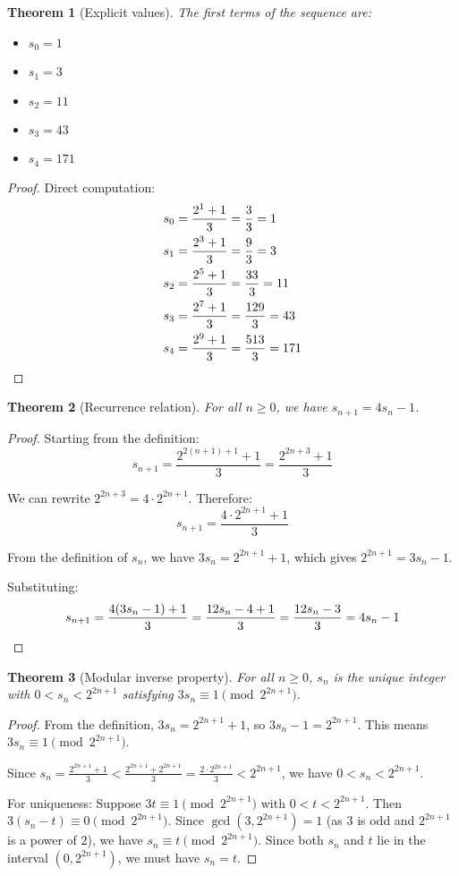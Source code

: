 \documentclass[11pt]{article}
\newtheorem{theorem}{Theorem}[section]
\theoremstyle{definition}
\begin{document}
\begin{theorem}[Explicit values]
The first terms of the sequence are:
\begin{itemize}
\item $s_0 = 1$
\item $s_1 = 3$
\item $s_2 = 11$
\item $s_3 = 43$
\item $s_4 = 171$
\end{itemize}
\end{theorem}

\begin{proof}
Direct computation:
\begin{align}
s_0 &= \frac{2^1 + 1}{3} = \frac{3}{3} = 1\\
s_1 &= \frac{2^3 + 1}{3} = \frac{9}{3} = 3\\
s_2 &= \frac{2^5 + 1}{3} = \frac{33}{3} = 11\\
s_3 &= \frac{2^7 + 1}{3} = \frac{129}{3} = 43\\
s_4 &= \frac{2^9 + 1}{3} = \frac{513}{3} = 171 \qedhere
\end{align}
\end{proof}

\begin{theorem}[Recurrence relation]\label{thm:recurrence}
For all $n \geq 0$, we have $s_{n+1} = 4s_n - 1$.
\end{theorem}

\begin{proof}
Starting from the definition:
\[s_{n+1} = \frac{2^{2(n+1)+1} + 1}{3} = \frac{2^{2n+3} + 1}{3}\]

We can rewrite $2^{2n+3} = 4 \cdot 2^{2n+1}$. Therefore:
\[s_{n+1} = \frac{4 \cdot 2^{2n+1} + 1}{3}\]

From the definition of $s_n$, we have $3s_n = 2^{2n+1} + 1$, which gives $2^{2n+1} = 3s_n - 1$.

Substituting:
\[s_{n+1} = \frac{4(3s_n - 1) + 1}{3} = \frac{12s_n - 4 + 1}{3} = \frac{12s_n - 3}{3} = 4s_n - 1 \qedhere\]
\end{proof}

\begin{theorem}[Modular inverse property]
For all $n \geq 0$, $s_n$ is the unique integer with $0 < s_n < 2^{2n+1}$ satisfying $3s_n \equiv 1 \pmod{2^{2n+1}}$.
\end{theorem}

\begin{proof}
From the definition, $3s_n = 2^{2n+1} + 1$, so $3s_n - 1 = 2^{2n+1}$.
This means $3s_n \equiv 1 \pmod{2^{2n+1}}$.

Since $s_n = \frac{2^{2n+1} + 1}{3} < \frac{2^{2n+1} + 2^{2n+1}}{3} = \frac{2 \cdot 2^{2n+1}}{3} < 2^{2n+1}$, we have $0 < s_n < 2^{2n+1}$.

For uniqueness: Suppose $3t \equiv 1 \pmod{2^{2n+1}}$ with $0 < t < 2^{2n+1}$.
Then $3(s_n - t) \equiv 0 \pmod{2^{2n+1}}$.
Since $\gcd(3, 2^{2n+1}) = 1$ (as $3$ is odd and $2^{2n+1}$ is a power of $2$), we have $s_n \equiv t \pmod{2^{2n+1}}$.
Since both $s_n$ and $t$ lie in the interval $(0, 2^{2n+1})$, we must have $s_n = t$.
\end{proof}
\end{document}
